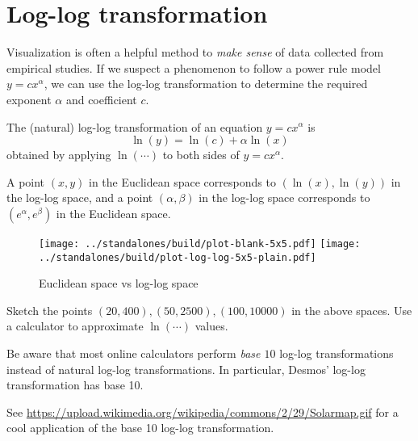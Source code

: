 \documentclass[../main.tex]{subfiles}
\begin{document}
 \section{Log-log transformation}

Visualization is often a helpful method to \emph{make sense} of data collected from empirical studies. If we suspect a phenomenon to follow a power rule model \(y = c x^{\alpha}\), we can use the log-log transformation to determine the required exponent \(\alpha\) and coefficient \(c\).

\begin{definition}
  The (natural) log-log transformation of an equation \(y = c x^{\alpha}\) is
  \[
    \ln(y) = \ln(c) + \alpha \ln(x)
  \]
  obtained by applying \(\ln(\cdots)\) to both sides of \(y = c x^{\alpha}\).
\end{definition}



\begin{definition}
  A point \((x,y)\) in the Euclidean space corresponds to \((\ln(x), \ln(y))\) in the log-log space, and a point \((\alpha,\beta)\) in the log-log space corresponds to \((e^{\alpha}, e^{\beta})\) in the Euclidean space.
\end{definition}

\begin{figure}[H] %
  \centering
  
  \hfill{}
  \texttt{[image: ../standalones/build/plot-blank-5x5.pdf]}
  \hfill{}
  \texttt{[image: ../standalones/build/plot-log-log-5x5-plain.pdf]}
  \hfill{}

  \caption{Euclidean space vs log-log space}
  \label{fig:figure}
\end{figure}

\begin{example}
  Sketch the points \((20,400), (50, 2500), (100,10000) \) in the above spaces. Use a calculator to approximate \(\ln(\cdots)\) values.

\end{example}

\faCalculator{} Be aware that most online calculators perform \emph{base \(10\)} log-log transformations instead of natural log-log transformations.  In particular, Desmos' log-log transformation has base 10. 

See \url{https://upload.wikimedia.org/wikipedia/commons/2/29/Solarmap.gif} for a cool application of the base 10 log-log transformation.
\end{document}
